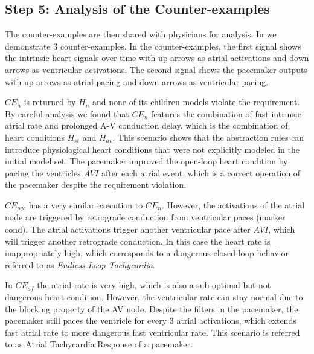 	\vspace{-10pt}
\subsection*{Step 5: Analysis of the Counter-examples}
The counter-examples are then shared with physicians for analysis. In  we demonstrate 3 counter-examples. In the counter-examples, the first signal shows the intrinsic heart signals over time with up arrows as atrial activations and down arrows as ventricular activations. The second signal shows the pacemaker outputs with up arrows as atrial pacing and down arrows as ventricular pacing.%

$CE_{n}$ is returned by $H_n$ and none of its children models violate the requirement. By careful analysis we found that $CE_{n}$ features the combination of fast intrinsic atrial rate and prolonged A-V conduction delay, which is the combination of heart conditions $H_{st}$ and $H_{av}$. This scenario shows that the abstraction rules can introduce physiological heart conditions that were not explicitly modeled in the initial model set. The pacemaker improved the open-loop heart condition by pacing the ventricles $AVI$ after each atrial event, which is a correct operation of the pacemaker despite the requirement violation. %

$CE_{pvc}$ has a very similar execution to $CE_{n}$. However, the activations of the atrial node are triggered by retrograde conduction from ventricular paces (marker \textsf{cond}). The atrial activations trigger another ventricular pace after $AVI$, which will trigger another retrograde conduction. In this case the heart rate is inappropriately high, which corresponds to a dangerous closed-loop behavior referred to as \emph{Endless Loop Tachycardia}.

In $CE_{af}$ the atrial rate is very high, which is also a sub-optimal but not dangerous heart condition. 
However, the ventricular rate can stay normal due to the blocking property of the AV node. 
Despite the filters in the pacemaker, the pacemaker still paces the ventricle for every 3 atrial activations, which extends fast atrial rate to more dangerous fast ventricular rate. 
This scenario is referred to as Atrial Tachycardia Response of a pacemaker. 

